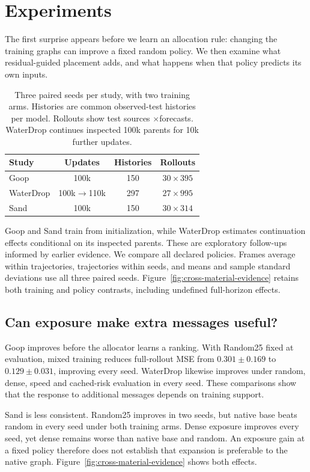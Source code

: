 \section{Experiments}
The first surprise appears before we learn an allocation rule: changing the training graphs can improve a fixed random policy. We then examine what residual-guided placement adds, and what happens when that policy predicts its own inputs.

\begin{table}[t]
\centering\small
\caption{Three paired seeds per study, with two training arms. Histories are common observed-test histories per model. Rollouts show test sources $\times$forecasts. WaterDrop continues inspected 100k parents for 10k further updates.}
\label{tab:study-overview}
\setlength{\tabcolsep}{3pt}
\begin{tabular}{lccc}
\toprule
Study & Updates & Histories & Rollouts\\
\midrule
Goop &100k&150&$30\times395$\\
WaterDrop &100k$\to$110k&297&$27\times995$\\
Sand &100k&150&$30\times314$\\
\bottomrule
\end{tabular}
\end{table}

Goop and Sand train from initialization, while WaterDrop estimates continuation effects conditional on its inspected parents. These are exploratory follow-ups informed by earlier evidence. We compare all declared policies. Frames average within trajectories, trajectories within seeds, and means and sample standard deviations use all three paired seeds. Figure~\ref{fig:cross-material-evidence} retains both training and policy contrasts, including undefined full-horizon effects.

\subsection{Can exposure make extra messages useful?}
Goop improves before the allocator learns a ranking. With Random25 fixed at evaluation, mixed training reduces full-rollout MSE from $0.301\pm0.169$ to $0.129\pm0.031$, improving every seed. WaterDrop likewise improves under random, dense, speed and cached-risk evaluation in every seed. These comparisons show that the response to additional messages depends on training support.

Sand is less consistent. Random25 improves in two seeds, but native base beats random in every seed under both training arms. Dense exposure improves every seed, yet dense remains worse than native base and random. An exposure gain at a fixed policy therefore does not establish that expansion is preferable to the native graph. Figure~\ref{fig:cross-material-evidence} shows both effects.


